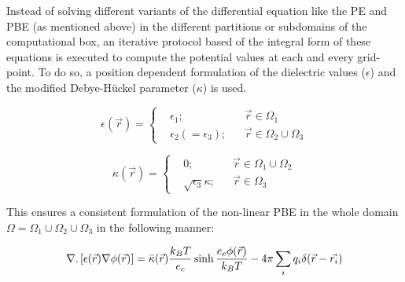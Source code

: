\documentclass[9pt,tutorial]{livecoms}
\begin{document}
Instead of solving different variants of the differential equation like the PE and PBE (as mentioned above) in the different partitions or subdomains of the computational box, an iterative protocol based of the integral form of these equations is executed to compute the potential values at each and every grid-point. To do so, a position dependent formulation of the dielectric values ($ \epsilon $) and the modified Debye-Hückel parameter ($ \kappa $) is used. 

\begin{equation}
  \epsilon(\Vec{r}) = \left \{
  \begin{aligned}
    &\epsilon_1; && \Vec{r} \in \Omega_1 \\
    &\epsilon_2 (=\epsilon_3) ; && \Vec{r} \in \Omega_2 \cup \Omega_3
  \end{aligned} \right.
\end{equation}

\begin{equation}
  \kappa(\Vec{r}) = \left \{
  \begin{aligned}
    &0; && \Vec{r} \in \Omega_1 \cup \Omega_2 \\
    & \sqrt{\epsilon_3}\kappa ; && \Vec{r} \in \Omega_3
  \end{aligned} \right.
\end{equation}

This ensures a consistent formulation of the non-linear PBE in the whole domain $ \Omega = \Omega_1 \cup \Omega_2 \cup \Omega_3 $ in the following manner:

\begin{equation}
    \nabla.\left[\epsilon(\Vec{r})\nabla\phi(\Vec{r})\right] = \Bar{\kappa}(\Vec{r})\frac{k_BT}{e_c}\sinh{\frac{e_c\phi(\Vec{r})}{k_BT}} - 4\pi\sum_{i} {q_i \delta(\Vec{r} - \Vec{r_i})}
\end{equation}
\end{document}
